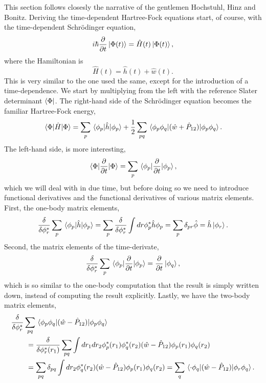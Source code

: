This section follows closesly the narrative of the gentlemen Hochstuhl, Hinz and 
Bonitz\cite{hochstuhl2014time}. Deriving the time-dependent Hartree-Fock equations start,
of course, with the time-dependent Schrödinger equation,
\begin{equation}
    i\hbar \frac{\partial}{\partial t}\ket{\Phi(t)} = \hat{H}(t)\ket{\Phi(t)},
\end{equation}
where the Hamiltonian is 
\begin{equation}
    \hat{H}(t) = \hat{h}(t) + \hat{w}(t).
\end{equation}
This is very similar to the one used the same, except for the introduction of a 
time-dependence. We start by multiplying from the left with the reference Slater
determinant $\bra{\Phi}$. The right-hand side of the Schrödinger equation becomes
the familiar Hartree-Fock energy,
\begin{equation}
    \mel{\Phi}{\hat{H}}{\Phi} 
    = \sum_p \mel{\phi_p}{\hat{h}}{\phi_p}
    + \frac{1}{2} \sum_{pq}\mel{\phi_p\phi_q}{(\hat{w} + \hat{P}_{12})}{\phi_p\phi_q}.
\end{equation}
The left-hand side, is more interesting,
\begin{equation}
    \mel{\Phi}{\frac{\partial}{\partial t}}{\Phi} 
    = \sum_p \mel{\phi_p}{\frac{\partial}{\partial t}}{\phi_p},
\end{equation}
which we will deal with in due time, but before doing so we need to introduce 
functional derivatives and the functional derivatives of various matrix elements.
First, the one-body matrix elements,
\begin{equation}
        \frac{\delta}{\delta\phi^*_r} \sum_p \mel{\phi_p}{\hat{h}}{\phi_p}
        = \sum_p \frac{\delta}{\delta \phi^*_r}
            \int dr \phi_p^* \hat{h} \phi_p 
        = \sum_p \delta_{pr} \hat{\phi} = \hat{h}\ket{\phi_r}.
\end{equation}
Second, the matrix elements of the time-derivate,
\begin{equation}
    \frac{\delta}{\delta \phi_r^*} \sum_p\mel{\phi_p}{\frac{\partial}{\partial t}}{\phi_p}
    = \frac{\partial}{\partial t} \ket{\phi_q},
\end{equation}
which is so similar to the one-body computation that the result is simply written down,
instead of computing the result explicitly.
Lastly, we have the two-body matrix elements,
\begin{equation}
    \begin{aligned}
        \frac{\delta}{\delta \phi_r^*} &\sum_{pq}
            \mel{\phi_p\phi_q}{(\hat{w} - \hat{P}_{12})}{\phi_p\phi_q} \\
        &\ = \frac{\delta}{\delta \phi_r^*(r_1)} \sum_{pq} \int dr_1 dr_2 
            \phi_p^*(r_1) \phi_q^*(r_2)(\hat{w} - \hat{P}_{12})\phi_p(r_1)\phi_q(r_2) \\
        &\ = \sum_{pq}\delta_{pq} \int dr_2 \phi_q^*(r_2) 
            (\hat{w} - \hat{P}_{12}) \phi_p(r_1) \phi_q(r_2) 
        = \sum_q \mel{\cdot \phi_q}{(\hat{w} - \hat{P}_{12})}{\phi_r\phi_q}.
    \end{aligned}
\end{equation}

